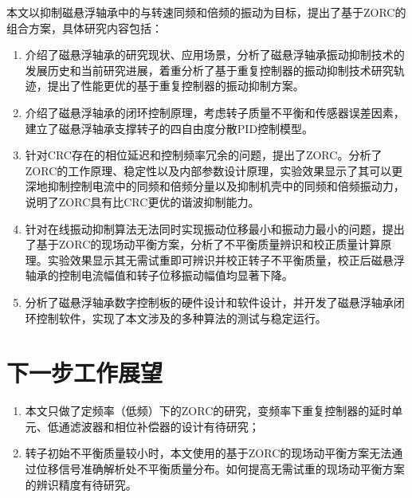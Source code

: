 \documentclass[
  lang=cn,
  degree=master,
  openany,oneside
]{nuaathesis}
\begin{document}
本文以抑制磁悬浮轴承中的与转速同频和倍频的振动为目标，提出了基于ZORC的组合方案，具体研究内容包括：
\begin{enumerate}
	\item 介绍了磁悬浮轴承的研究现状、应用场景，分析了磁悬浮轴承振动抑制技术的发展历史和当前研究进展，着重分析了基于重复控制器的振动抑制技术研究轨迹，提出了性能更优的基于重复控制器的振动抑制方案。
	\item 介绍了磁悬浮轴承的闭环控制原理，考虑转子质量不平衡和传感器误差因素，建立了磁悬浮轴承支撑转子的四自由度分散PID控制模型。
	\item 针对CRC存在的相位延迟和控制频率冗余的问题，提出了ZORC。分析了ZORC的工作原理、稳定性以及内部参数设计原理，实验效果显示了其可以更深地抑制控制电流中的同频和倍频分量以及抑制机壳中的同频和倍频振动力，说明了ZORC具有比CRC更优的谐波抑制能力。
	\item 针对在线振动抑制算法无法同时实现振动位移最小和振动力最小的问题，提出了基于ZORC的现场动平衡方案，分析了不平衡质量辨识和校正质量计算原理。实验效果显示其无需试重即可辨识并校正转子不平衡质量，校正后磁悬浮轴承的控制电流幅值和转子位移振动幅值均显著下降。
	\item 分析了磁悬浮轴承数字控制板的硬件设计和软件设计，并开发了磁悬浮轴承闭环控制软件，实现了本文涉及的多种算法的测试与稳定运行。
\end{enumerate}

\section{下一步工作展望}
\begin{enumerate}
	\item 本文只做了定频率（低频）下的ZORC的研究，变频率下重复控制器的延时单元、低通滤波器和相位补偿器的设计有待研究；
	\item 转子初始不平衡质量较小时，本文使用的基于ZORC的现场动平衡方案无法通过位移信号准确解析处不平衡质量分布。如何提高无需试重的现场动平衡方案的辨识精度有待研究。
\end{enumerate}

%
%
%
%

\appendix
%

\backmatter
%
\end{document}
